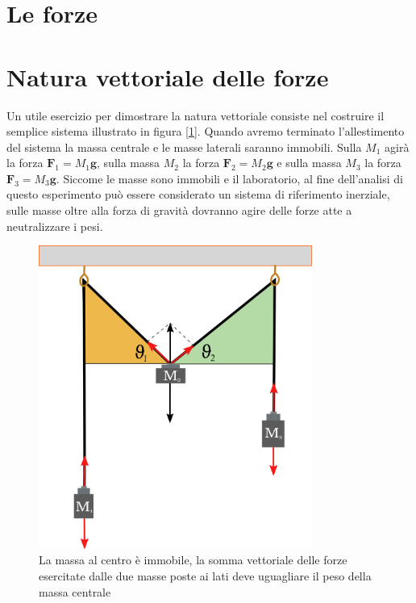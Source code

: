 \documentclass[a4paper,10pt,oneside]{article}
\begin{document}
\thispagestyle{empty}
 \section*{Le forze}
\vspace{1cm}

\section*{Natura vettoriale delle forze}

Un utile esercizio per  dimostrare la natura vettoriale consiste nel costruire il semplice sistema illustrato in figura  [\ref{fig:natura_forze}]. Quando avremo terminato l'allestimento del sistema la massa centrale e le masse laterali saranno immobili. Sulla $M_1$ agirà la forza $\mathbf{F}_1=M_1\mathbf{g}$, sulla massa $M_2$ la forza $\mathbf{F}_2=M_2\mathbf{g}$ e sulla massa $M_3$ la forza $\mathbf{F}_3=M_3\mathbf{g}$. Siccome le masse sono immobili e il laboratorio, al fine dell'analisi di questo esperimento può essere considerato un sistema di riferimento inerziale, sulle masse oltre alla forza di gravità dovranno agire delle forze atte a neutralizzare i pesi.

\begin{figure}[H]
 \centering
 \includegraphics[width=0.8\textwidth]{../immagini/natura_vettoriale_forze1.png}
 \caption{La massa al centro è immobile, la somma vettoriale delle forze esercitate dalle due masse poste ai lati deve uguagliare il peso della massa centrale}
 \label{fig:natura_forze}
\end{figure}
\end{document}

